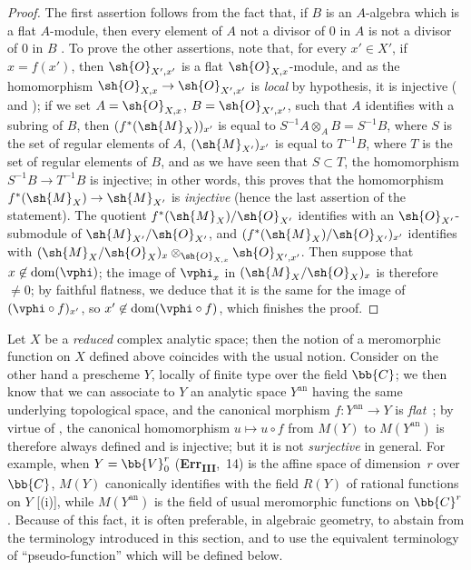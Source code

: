 \begin{proof}
The first assertion follows from the fact that, if $B$ is an $A$-algebra which is a flat $A$-module, then every element of $A$ not a divisor of $0$ in $A$ is not a divisor of $0$ in $B$ .
To prove the other assertions, note that, for every $x'\in X'$, if $x=f(x')$, then $\sh{O}_{X',x'}$ is a flat $\sh{O}_{X,x}$-module, and as the homomorphism $\sh{O}_{X,x}\to\sh{O}_{X',x'}$ is \emph{local} by hypothesis, it is injective ( and );
if we set $A=\sh{O}_{X,x}$, $B=\sh{O}_{X',x'}$, such that $A$ identifies with a subring of $B$, then $(f^*(\sh{M}_X))_{x'}$ is equal to $S^{-1}A\otimes_A B=S^{-1}B$, where $S$ is the set of regular elements of $A$, $(\sh{M}_{X'})_{x'}$ is equal to $T^{-1}B$, where $T$ is the set
of regular elements of $B$, and as we have seen that $S\subset T$, the homomorphism $S^{-1}B\to T^{-1}B$ is injective;
in other words, this proves that the homomorphism  $f^*(\sh{M}_X)\to\sh{M}_{X'}$ is \emph{injective} (hence the last assertion of the statement).
The quotient $f^*(\sh{M}_X)/\sh{O}_{X'}$ identifies with an $\sh{O}_{X'}$-submodule of $\sh{M}_{X'}/\sh{O}_{X'}$, and $(f^*(\sh{M}_X)/\sh{O}_{X'})_{x'}$ identifies with $(\sh{M}_X/\sh{O}_X)_x\otimes_{\sh{O}_{X,x}}\sh{O}_{X',x'}$.
Then suppose that $x\not\in\operatorname{dom}(\vphi)$;
the image of $\vphi_x$ in $(\sh{M}_X/\sh{O}_X)_x$ is therefore $\neq 0$;
by faithful flatness, we deduce that it is the same for the image of $(\vphi\circ f)_{x'}$, so $x'\not\in\operatorname{dom}(\vphi\circ f)$, which finishes the proof.
\end{proof}

\begin{remark}[20.1.13]
\label{IV.20.1.13}
Let $X$ be a \emph{reduced} complex analytic space;
then the notion of a meromorphic function on $X$ defined above coincides with the usual notion.
Consider on the other hand a prescheme $Y$, locally of finite type over the field $\bb{C}$;
we then know that we can associate to $Y$ an analytic space $Y^\mathrm{an}$ having the same underlying topological space, and the canonical morphism $f:Y^\mathrm{an}\to Y$ is \emph{flat}~\cite{IV-37};
by virtue of , the canonical homomorphism $u\mapsto u\circ f$ from $M(Y)$ to $M(Y^\mathrm{an})$ is therefore always defined and is injective;
but it is not \emph{surjective} in general.
For example, when $Y=\bb{V}_0^r$ (\textbf{Err}\textsubscript{\textbf{III}},~14) is the affine space of dimension~$r$ over $\bb{C}$, $M(Y)$ canonically identifies with the field $R(Y)$ of rational functions on $Y$ [(i)], while $M(Y^\mathrm{an})$ is the field of usual meromorphic functions on $\bb{C}^r$.
Because of this fact, it is often preferable, in algebraic geometry, to abstain from the terminology introduced in this section, and to use the equivalent terminology of ``pseudo-function'' which will be defined below.
\end{remark}

